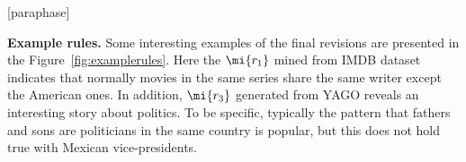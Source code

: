 [paraphase]

\textbf{Example rules.} Some interesting examples of the final revisions are presented in the Figure~\ref{fig:examplerules}. Here 
the $\mi{r_1}$ mined from IMDB dataset indicates that normally movies in the same series share the same writer except the American ones. In addition, $\mi{r_3}$ generated from YAGO reveals an interesting story about politics. To be specific, typically  the pattern that fathers and sons are politicians in the same country is popular, but this does not hold true with Mexican vice-presidents.